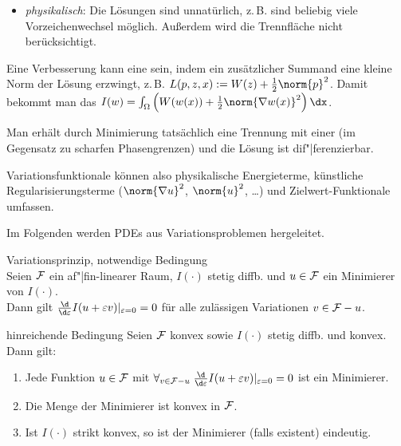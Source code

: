 \begin{Bsp}
\begin{itemize}
        \item
        \emph{physikalisch}:
        Die Lösungen sind unnatürlich, z.\,B. sind beliebig viele Vorzeichenwechsel möglich.
        Außerdem wird die Trennfläche nicht berücksichtigt.
    \end{itemize}

    Eine Verbesserung kann eine  sein, indem ein zusätzlicher Summand
    eine kleine Norm der Lösung erzwingt, z.\,B. $L(p, z, x) := W(z) + \frac{1}{2} \norm{p}^2$.
    Damit bekommt man das 
    $I(w) = \int_\Omega \left(W(w(x)) + \frac{1}{2} \norm{\nabla w(x)}^2\right) \dx$.

    Man erhält durch Minimierung tatsächlich eine Trennung mit einer
     (im Gegensatz zu scharfen Phasengrenzen) und die Lösung
    ist dif"|ferenzierbar.
\end{Bsp}

\linie

\begin{Bem}
    Variationsfunktionale können also
    physikalische Energieterme,
    künstliche Regularisierungsterme ($\norm{\nabla u}^2$, $\norm{u}^2$, \dots) und
    Zielwert-Funktionale umfassen.
\end{Bem}

\linie

\begin{Bem}
    Im Folgenden werden PDEs aus Variationsproblemen hergeleitet.
\end{Bem}

\begin{Satz}{Variationsprinzip, notwendige Bedingung}\\
    Seien $\mathcal{F}$ ein af"|fin-linearer Raum, $I(\cdot)$ stetig diffb. und $u \in \mathcal{F}$ ein Minimierer
    von $I(\cdot)$.\\
    Dann gilt $\frac{\d}{\d\varepsilon} I(u + \varepsilon v)|_{\varepsilon=0} = 0$
    für alle zulässigen Variationen $v \in \mathcal{F} - u$.
\end{Satz}

\begin{Satz}{hinreichende Bedingung}
    Seien $\mathcal{F}$ konvex sowie $I(\cdot)$ stetig diffb. und konvex.
    Dann gilt:
    \begin{enumerate}
        \item
        Jede Funktion $u \in \mathcal{F}$ mit
        $\forall_{v \in \F - u}\;
        \frac{\d}{\d\varepsilon} I(u + \varepsilon v)|_{\varepsilon=0} = 0$ ist ein Minimierer.

        \item
        Die Menge der Minimierer ist konvex in $\mathcal{F}$.

        \item
        Ist $I(\cdot)$ strikt konvex, so ist der Minimierer (falls existent) eindeutig.
    \end{enumerate}
\end{Satz}

